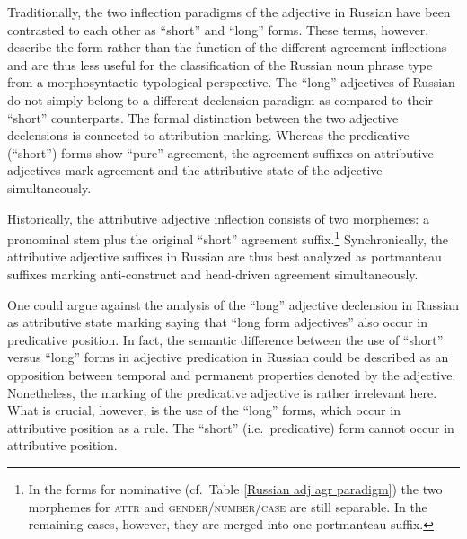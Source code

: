 Traditionally, the two inflection paradigms of the adjective in Russian have been contrasted to each other as “short” and “long” forms. These terms, however, describe the form rather than the function of the different agreement inflections and are thus less useful for the classification of the Russian noun phrase type from a morphosyntactic typological perspective. The “long” adjectives of Russian do not simply belong to a different declension paradigm as compared to their “short” counterparts. The formal distinction between the two adjective declensions is connected to attribution marking. Whereas the predicative (“short”) forms show “pure” agreement, the agreement suffixes on attributive adjectives mark agreement and the attributive state of the adjective simultaneously.

Historically, the attributive adjective inflection consists of two morphemes: a pronominal stem plus the original “short” agreement suffix.\footnote{In the forms for nominative (cf.~Table \ref{Russian adj agr paradigm}) the two morphemes for \textsc{attr} and \textsc{gender/number/case} are still separable. In the remaining cases, however, they are merged into one portmanteau suffix.} Synchronically, the attributive adjective suffixes in Russian are thus best analyzed as portmanteau suffixes marking anti-construct and head-driven agreement simultaneously.

One could argue against the analysis of the “long” adjective declension in Russian as attributive state marking saying that “long form adjectives” also occur in predicative position. In fact, the semantic difference between the use of “short” versus “long” forms in adjective predication in Russian could be described as an opposition between temporal and permanent properties denoted by the adjective.
Nonetheless, the marking of the predicative adjective is rather irrelevant here. What is crucial, however, is the use of the “long” forms, which occur in attributive position as a rule. The “short” (i.e.~predicative) form cannot occur in attributive position.

